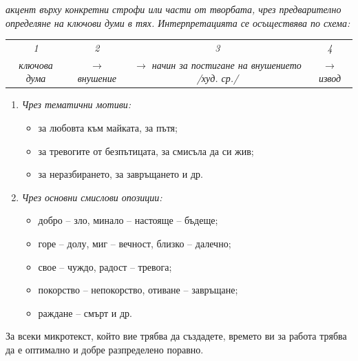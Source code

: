 \documentclass[12pt,a4paper]{article}
\begin{document}
\emph{
акцент върху конкретни строфи или части от творбата, чрез предварително
определяне на ключови думи в тях. Интерпретацията се осъществява
по схема:
}

\vspace{-0.1cm}

\begin{center}
\begin{tabular}{c c c c}
\emph{1} & \emph{2} & \emph{3} & \emph{4} \\
\emph{ключова дума} & \emph{$\rightarrow$ внушение} & \emph{$\rightarrow$ начин за постигане на внушението /худ. ср./} & \emph{$\rightarrow$ извод}
\end{tabular}
\end{center}

\vspace{-0.3cm}

\begin{enumerate}

\item
\emph{Чрез тематични мотиви:}

\begin{itemize}
    \vspace{-0.25cm}
    \item за любовта към майката, за пътя;
    \item за тревогите от безпътицата, за смисъла да си жив;
    \item за неразбирането, за завръщането и др.
\end{itemize}

\item
\emph{Чрез основни смислови опозиции:}

\begin{itemize}
    \vspace{-0.25cm}
    \item добро -- зло, минало -- настояще -- бъдеще;
    \item горе -- долу, миг -- вечност, близко -- далечно;
    \item свое -- чуждо, радост -- тревога;
    \item покорство -- непокорство, отиване -- завръщане;
    \item раждане -- смърт и др.
\end{itemize}

\end{enumerate}

За всеки микротекст, който вие трябва да създадете, времето ви за работа трябва да е оптимално и добре разпределено поравно.
\end{document}

